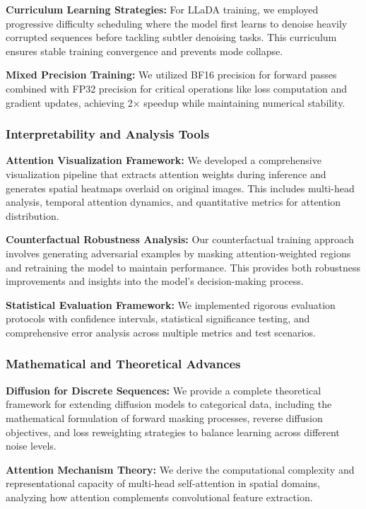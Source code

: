 \documentclass[a4paper,12pt]{article}
\begin{document}
\textbf{Curriculum Learning Strategies:} For LLaDA training, we employed progressive difficulty scheduling where the model first learns to denoise heavily corrupted sequences before tackling subtler denoising tasks. This curriculum ensures stable training convergence and prevents mode collapse.

\textbf{Mixed Precision Training:} We utilized BF16 precision for forward passes combined with FP32 precision for critical operations like loss computation and gradient updates, achieving 2× speedup while maintaining numerical stability.

\subsubsection{Interpretability and Analysis Tools}

\textbf{Attention Visualization Framework:} We developed a comprehensive visualization pipeline that extracts attention weights during inference and generates spatial heatmaps overlaid on original images. This includes multi-head analysis, temporal attention dynamics, and quantitative metrics for attention distribution.

\textbf{Counterfactual Robustness Analysis:} Our counterfactual training approach involves generating adversarial examples by masking attention-weighted regions and retraining the model to maintain performance. This provides both robustness improvements and insights into the model's decision-making process.

\textbf{Statistical Evaluation Framework:} We implemented rigorous evaluation protocols with confidence intervals, statistical significance testing, and comprehensive error analysis across multiple metrics and test scenarios.

\subsubsection{Mathematical and Theoretical Advances}

\textbf{Diffusion for Discrete Sequences:} We provide a complete theoretical framework for extending diffusion models to categorical data, including the mathematical formulation of forward masking processes, reverse diffusion objectives, and loss reweighting strategies to balance learning across different noise levels.

\textbf{Attention Mechanism Theory:} We derive the computational complexity and representational capacity of multi-head self-attention in spatial domains, analyzing how attention complements convolutional feature extraction.
\end{document}
